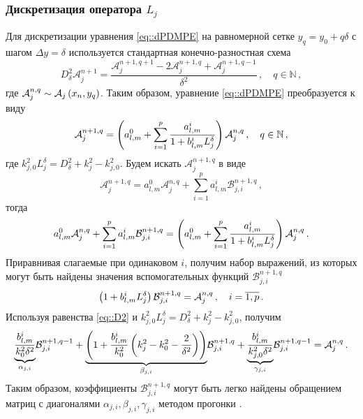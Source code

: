 \documentclass[../document.tex]{subfiles}
\begin{document}
			\subsubsection{Дискретизация оператора $L_j$}
				\par Для дискретизации уравнения \eqref{eq::dPDMPE} на равномерной сетке $y_q=y_0+q\delta$ с шагом $\Delta y=\delta$ используется стандартная конечно-разностная схема
				\begin{equation}\label{eq::D2}
					D_\delta^2\mathcal{A}_j^{n+1}=\frac{\mathcal{A}_j^{n+1,q+1}-2\mathcal{A}_j^{n+1,q}+\mathcal{A}_j^{n+1,q-1}}{\delta^2}\,,\quad q\in\mathbb{N}\,,
				\end{equation}
				где $\mathcal{A}_j^{n,q}\sim\mathcal{A}_j\left(x_n,y_q\right)$. Таким образом, уравнение \eqref{eq::dPDMPE} преобразуется к виду
				\begin{equation}\label{eq::ddPDMPE}
					\mathcal{A}_j^{n+1,q}=\left(a_{l,m}^0+\sum\limits_{i=1}^p\frac{a_{l,m}^i}{1+b_{l,m}^iL_j^\delta}\right)\mathcal{A}_j^{n,q}\,,\quad q\in\mathbb{N}\,,
				\end{equation}
				где $k_{j,0}^2L_j^\delta=D_\delta^2+k_j^2-k_{j,0}^2$. Будем искать $\mathcal{A}_j^{n+1,q}$ в виде
                \begin{equation}
                    \mathcal{A}_j^{n+1,q}=a_{l,m}^0\mathcal{A}_j^{n,q}+\sum\limits_{i=1}^pa_{l,m}^i\mathcal{B}_{j,i}^{n+1,q}\,,
                \end{equation}
                тогда
                \begin{equation}
                    a_{l,m}^0\mathcal{A}_j^{n,q}+\sum\limits_{i=1}^pa_{l,m}^i\mathcal{B}_{j,i}^{n+1,q}=\left(a_{l,m}^0+\sum\limits_{i=1}^p\frac{a_{l,m}^i}{1+b_{l,m}^iL_j^\delta}\right)\mathcal{A}_j^{n,q}\,.
                \end{equation}
                Приравнивая слагаемые при одинаковом $i$, получим набор выражений, из которых могут быть найдены значения вспомогательных функций $\mathcal{B}_{j,i}^{n+1,q}$
                \begin{equation}\label{eq::BEQ}
                    \left(1+b_{l,m}^iL_j^\delta\right)\mathcal{B}_{j,i}^{n+1,q}=\mathcal{A}_j^{n,q}\,,\quad i=\overline{1,p}\,.
                \end{equation}
                Используя равенства \eqref{eq::D2} и $k_{j,0}^2L_j^\delta=D_\delta^2+k_j^2-k_{j,0}^2$, получим
                \begin{equation}
                    \underset{\alpha_{j,i}}{\underbrace{\frac{b_{l,m}^i}{k_0^2\delta^2}}}\mathcal{B}_{j,i}^{n+1,q-1}+\underset{\beta_{j,i}}{\underbrace{\left(1+\frac{b_{l,m}^i}{k_0^2}\left(k_j^2-k_0^2-\frac{2}{\delta^2}\right)\right)}}\mathcal{B}_{j,i}^{n+1,q}+\underset{\gamma_{j,i}}{\underbrace{\frac{b_{l,m}^i}{k_{j,0}^2\delta^2}}}\mathcal{B}_{j,i}^{n+1,q-1}=\mathcal{A}_j^{n,q}\,.
                \end{equation}
                Таким образом, коэффициенты $\mathcal{B}_{j,i}^{n+1,q}$ могут быть легко найдены обращением матриц с диагоналями $\alpha_{j,i},\beta_{j,i},\gamma_{j,i}$ методом прогонки \cite{abramov}.
\end{document}
